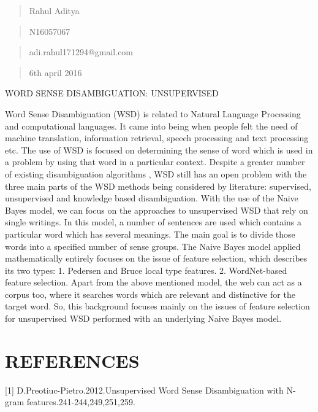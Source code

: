 \documentclass[11pt]{article}
\begin{document}
\begin{quotation}
					Rahul Aditya
	
\end{quotation}

\begin{quotation}
					N16057067
\end{quotation}

\begin{quotation}
					adi.rahul171294@gmail.com
\end{quotation}

\begin{quotation}
					6th april 2016
\end{quotation}
	
WORD SENSE DISAMBIGUATION: UNSUPERVISED


Word Sense Disambiguation (WSD) is related to Natural Language Processing and computational languages. It came into being when people felt the need of machine translation, information retrieval, speech processing and text processing etc. The use of WSD is focused on determining the sense of word which is used in a problem by using that word in a particular context. Despite a greater number of existing disambiguation algorithms , WSD still has an open problem with the three main parts of the WSD methods being considered by literature: supervised, unsupervised and knowledge based disambiguation.
With the use of the Naive Bayes model, we can focus on the approaches to unsupervised WSD that rely on single writings. In this model, a number of sentences are used which contains a particular word which has several meanings. The main goal is to divide those words into a specified number of sense groups.
The Naive Bayes model applied mathematically entirely focuses on the issue of feature selection, which describes its two types:
1. Pedersen and Bruce local type features.
2. WordNet-based feature selection.
Apart from the above mentioned model, the web can act as a corpus too, where it searches words which are relevant and distinctive for the target word.
So, this background focuses mainly on the issues of feature selection for unsupervised WSD performed with an underlying Naive Bayes model.

\section{REFERENCES}


[1] D.Preotiuc-Pietro.2012.Unsupervised Word Sense Disambiguation with N-gram features.241-244,249,251,259. 
\end{document}
